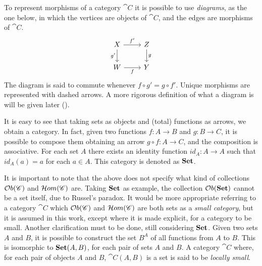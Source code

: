 To represent morphisms of a category $\cat{C}$ it is possible to use \emph{diagrams}, as the one below, in which the vertices are objects of $\cat{C}$, and the edges are morphisms of $\cat{C}$.
    \[
    \begin{tikzcd}
        X \arrow[d, "g'" swap] \arrow[r, "f'"] & Z \arrow[d, "g"] \\
        W \arrow[r, "f" swap] & Y        
    \end{tikzcd}
    \]
The diagram is said to commute whenever  $f \circ g' = g \circ f'$. Unique morphisms are represented with dashed arrows.
A more rigorous definition of what a diagram is will be given later ().

\begin{example}
    It is easy to see that taking sets as objects and (total) functions as arrows, we obtain a category. In fact, given two functions $f: A \rightarrow B$ and $g: B \rightarrow C$, it is possible to compose them obtaining an arrow $g \circ f : A \rightarrow C$, and the composition is associative. For each set $A$ there exists an identity function $id_A: A \rightarrow A$ such that $id_A(a) = a$ for each $a\in A$.
    This category is denoted as $\mathbf{Set}$.
\end{example}

\begin{remark}\label{rem:small_cats}
    It is important to note that the  above does not specify what kind of collections
    $\mathcal{O}b(\mathscr{C})$ and $\mathcal{H}om(\mathscr{C})$ are.
    Taking $\mathbf{Set}$ as example, the collection $\mathcal{O}b(\mathbf{Set})$ cannot be a set itself, due to Russel's paradox. It would be more appropriate referring to a category $\cat{C}$ which $\mathcal{O}b(\mathscr{C})$ and $\mathcal{H}om(\mathscr{C})$ are both sets as a \emph{small category}, but it is assumed in this work, except where it is made explicit, for a category to be small.
    Another clarification must to be done, still considering $\mathbf{Set}$. Given two sets $A$ and $B$, it is possible to construct the set $B^A$ of all functions from $A$ to $B$. This is isomorphic to $\mathbf{Set}(A, B)$, for each pair of sets $A$ and $B$.
    A category $\cat C$ where, for each pair of objects $A$ and $B$, $\cat C (A, B)$ is a set is said to be \emph{locally small}.
\end{remark}

